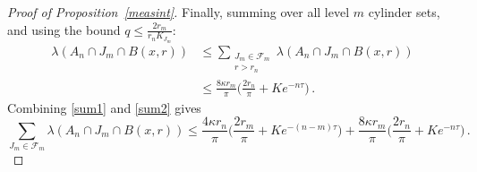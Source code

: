 \documentclass[10pt,a4paper]{amsart}
\begin{document}
\begin{proof}[Proof of Proposition~\ref{measint}]
Finally, summing over all level $m$ cylinder sets, and using the bound $q \leq \frac{2r_m}{r_n K_{J_m}}$:
\begin{align}\label{sum2}
    \lambda(A_n \cap J_m \cap B(x,r)) &\leq \sum\limits_{\substack{J_m \in \mathcal{F}_m  \\ r > r_n}} \lambda(A_n \cap J_m \cap B(x,r)) \nonumber %
    \\[2ex] & \leq \frac{8\kappa r_m}{\pi}\big(\frac{2r_n}{\pi}+Ke^{-n\tau} \big) \, .
\end{align}
Combining \eqref{sum1} and \eqref{sum2} gives 
$$
\sum\limits_{J_m \in \mathcal{F}_m } \lambda(A_n \cap J_m \cap B(x,r)) \leq \frac{4\kappa r_n}{\pi}\big(\frac{2r_m}{\pi}+Ke^{-(n-m)\tau}\big) + \frac{8\kappa r_m}{\pi}\big(\frac{2r_n}{\pi}+Ke^{-n\tau} \big)\, .
$$
    \end{proof}
\end{document}
